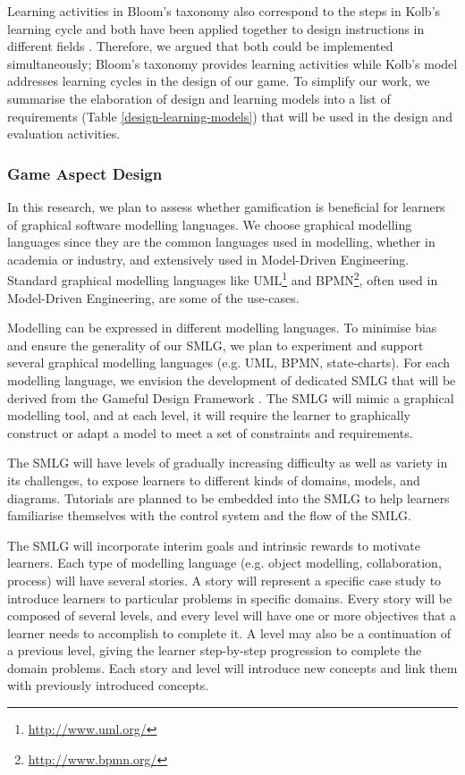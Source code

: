 \documentclass[12pt, a4paper]{report} \usepackage[titletoc]{appendix}
\begin{document}
Learning activities in Bloom's taxonomy also correspond to the steps in Kolb's learning cycle \cite{murphy2007prior} and both have been applied together to design instructions in different fields \cite{terry1993kolb, howard1996felder, schatzberg2002applying}. Therefore, we argued that both could be implemented simultaneously; Bloom's taxonomy provides learning activities while Kolb's model addresses learning cycles in the design of our game. To simplify our work, we summarise the elaboration of design and learning models into a list of requirements (Table \ref{design-learning-models}) that will be used in the design and evaluation activities.

\subsubsection{Game Aspect Design}
In this research, we plan to assess whether gamification is beneficial for learners of graphical software modelling languages. We choose graphical modelling languages since they are the common languages used in modelling, whether in academia or industry, and extensively used in Model-Driven Engineering. Standard graphical modelling languages like UML\footnote{\url{http://www.uml.org/}} and BPMN\footnote{\url{http://www.bpmn.org/}}, often used in Model-Driven Engineering, are some of the use-cases.        

Modelling can be expressed in different modelling languages. To minimise bias and ensure the generality of our SMLG, we plan to experiment and support several graphical modelling languages (e.g. UML, BPMN, state-charts). For each modelling language, we envision the development of dedicated SMLG that will be derived from the Gameful Design Framework \cite{deterding2015lens}. The SMLG will mimic a graphical modelling tool, and at each level, it will require the learner to graphically construct or adapt a model to meet a set of constraints and requirements.

The SMLG will have levels of gradually increasing difficulty as well as variety in its challenges, to expose learners to different kinds of domains, models, and diagrams. Tutorials are planned to be embedded into the SMLG to help learners familiarise themselves with the control system and the flow of the SMLG. 

The SMLG will incorporate interim goals and intrinsic rewards to motivate learners. Each type of modelling language (e.g. object modelling, collaboration, process) will have several stories. A story will represent a specific case study to introduce learners to particular problems in specific domains. Every story will be composed of several levels, and every level will have one or more objectives that a learner needs to accomplish to complete it. A level may also be a continuation of a previous level, giving the learner step-by-step progression to complete the domain problems. Each story and level will introduce new concepts and link them with previously introduced concepts.
\end{document}
